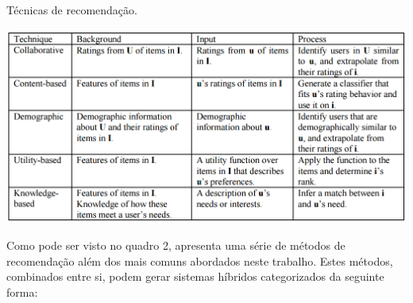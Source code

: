 \begin{quadro}[h!tp]
	\caption{\label{recommender_systems}Técnicas de recomendação.}
	\begin{center}
		\includegraphics[scale=0.6]{images/recommender_systems.png}
	\end{center}
\end{quadro}

Como pode ser visto no quadro 2,  apresenta uma série de métodos de recomendação além dos mais comuns abordados neste trabalho. Estes métodos, combinados entre si, podem gerar sistemas híbridos categorizados da seguinte forma:

